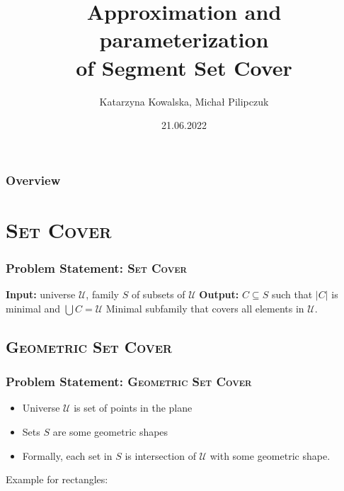 \documentclass{beamer}
\title[Segment Set Cover]{Approximation and parameterization\\
of Segment Set Cover}
\author{Katarzyna Kowalska, Michał Pilipczuk} %
\institute[UW] %
{
University of Warsaw, MIMUW \\ %
\medskip
\textit{kk371053@students.mimuw.edu.pl} %
}
\date{21.06.2022} %
\begin{document}
\begin{frame}
\titlepage %
\end{frame}

\begin{frame}
\frametitle{Overview} %
\tableofcontents %
\end{frame}



\section{\textsc{Set Cover}}
\begin{frame}
\frametitle{Problem Statement: \textsc{Set Cover}}
\textbf{Input:} universe $\mathcal{U}$,
family $S$ of subsets of $\mathcal{U}$
\newline
\textbf{Output:} $C \subseteq S$ such that $|C|$ is minimal and
$\bigcup C = \mathcal{U}$
\newline
Minimal subfamily that covers all elements in $\mathcal{U}$.



\end{frame}
\subsection{\textsc{Geometric Set Cover}}

\begin{frame}
\frametitle{Problem Statement: \textsc{Geometric Set Cover}}
\begin{itemize}
\item Universe $\mathcal{U}$ is set of points in the plane
\item Sets $S$ are some geometric shapes
\item Formally, each set in $S$ is intersection of $\mathcal{U}$
with some geometric shape.
\end{itemize}

Example for rectangles:




\end{frame}
\end{document}
